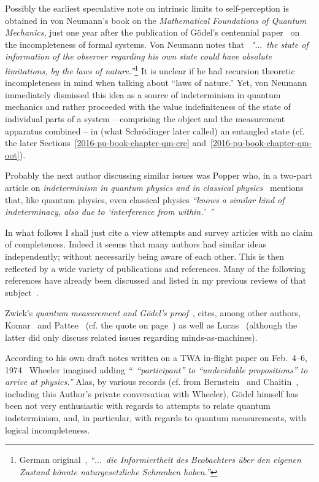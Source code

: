 Possibly the earliest speculative note on intrinsic limits to
 self-perception is obtained in von Neumann's book on the {\em Mathematical Foundations of Quantum Mechanics,}
just one year after the publication of G\"odel's centennial paper~\cite{godel1} on the incompleteness of formal systems.
Von Neumann notes that~\cite[Section~VI.3, p.~438]{v-neumann-55}
{\em "$\ldots$~the state of
information of the observer regarding his own state could
have  absolute limitations, by the laws of nature.''}\footnote{
German original~\cite[Section~VI.3, p.~233]{v-neumann-49},
{\em ``$\ldots$~die Informiertheit des Beobachters
\"uber den eigenen Zustand k\"onnte naturgesetzliche Schranken haben.''}}
It is unclear if he had recursion theoretic incompleteness in mind when talking about
``laws of nature.''
Yet, von Neumann immediately dismissed this idea as a source of indeterminism in quantum mechanics
and rather proceeded with the value indefiniteness of the state of individual parts of a system
-- comprising the object and the measurement apparatus combined --  in (what Schr\"odinger later called) an entangled state
(cf. the later Sections~\ref{2016-pu-book-chapter-qm-cre}  and~\ref{2016-pu-book-chapter-qm-oot}).

Probably the next author discussing similar issues was Popper
who, in a two-part article on {\em indeterminism in quantum physics and in classical physics}~\cite{popper-50i,popper-50ii}
mentions that, like quantum physics, even classical physics {\em ``knows a similar kind of indeterminacy, also
due to `interference from within.'~''}

In what follows I shall just cite a view attempts and survey articles with no claim of completeness.
Indeed it seems that many authors had similar ideas independently; without necessarily being aware of each other.
This is then reflected by a wide variety of
publications and references.
Many of the following references have already been discussed and listed in my previous
reviews of that subject~\cite{svozil-93,svozil-07-physical_unknowables}.

Zwick's {\em quantum measurement and {G}\"odel's proof}~\cite{zwick-78}, cites, among other authors, Komar~\cite{komar}
and Pattee~\cite[p.~117]{Pattee2012} (cf. the quote on page~\pageref{2016-pu-book-chapter-eo-pattee}) as well as Lucas~\cite{Lucas_1961}
(although the latter did only discuss related issues regarding minds-as-machines).

According to his own draft notes written on a {TWA} in-flight paper on Feb.~4--6, 1974~\cite{wheeler-74}
Wheeler imagined adding {\em ``~``participant'' to ``undecidable propositions'' to arrive at physics.''}
Alas, by various records (cf. from Bernstein~\cite[p.~140-141]{bernstein}
and Chaitin~\cite[p.~112]{svozil-93},  including this Author's private conversation with Wheeler),
G\"odel himself has been not very enthusiastic with regards to attempts to relate quantum indeterminism,
and, in particular, with regards to quantum measurements, with logical incompleteness.


